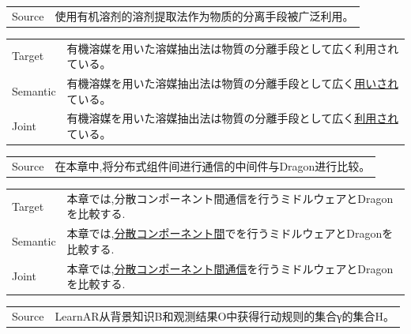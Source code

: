 \vspace{0.4cm}
\begin{table}[h]
    \centering
    \begin{CJK}{UTF8}{gbsn}
        \begin{tabularx}{\textwidth}{p{1.2cm}b}\toprule
            Source & 使用有机溶剂的溶剂提取法作为物质的分离手段被广泛利用。 \\
        \end{tabularx}
    \end{CJK}

    \begin{CJK}{UTF8}{long}
        \begin{tabularx}{\textwidth}{p{1.2cm}b}
            Target & 有機溶媒を用いた溶媒抽出法は物質の分離手段として広く利用されている。 \\
            Semantic & 有機溶媒を用いた溶媒抽出法は物質の分離手段として広く\underline{用いされ}ている。 \\
            Joint & 有機溶媒を用いた溶媒抽出法は物質の分離手段として広く\underline{利用され}ている。 \\\midrule
        \end{tabularx}
    \end{CJK}

    \begin{CJK}{UTF8}{gbsn}
        \begin{tabularx}{\textwidth}{p{1.2cm}b}
            Source & 在本章中,将分布式组件间进行通信的中间件与Dragon进行比较。 \\
        \end{tabularx}
    \end{CJK}

    \begin{CJK}{UTF8}{long}
        \begin{tabularx}{\textwidth}{p{1.2cm}b}
            Target & 本章では,分散コンポーネント間通信を行うミドルウェアとDragonを比較する. \\
            Semantic & 本章では,\underline{分散コンポーネント間}でを行うミドルウェアとDragonを比較する. \\
            Joint & 本章では,\underline{分散コンポーネント間通信}を行うミドルウェアとDragonを比較する. \\\midrule
        \end{tabularx}
    \end{CJK}

    \begin{CJK}{UTF8}{gbsn}
        \begin{tabularx}{\textwidth}{p{1.2cm}b}
            Source & LearnAR从背景知识B和观测结果O中获得行动规则的集合γ的集合H。 \\
        \end{tabularx}
    \end{CJK}


\end{table}
